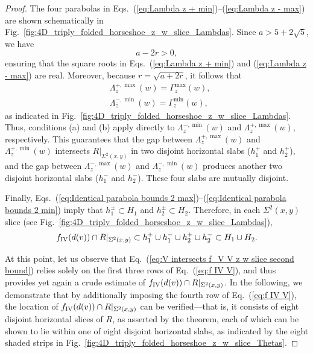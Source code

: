 \documentclass[12pt]{iopart}
\begin{document}
\begin{proof}
The four parabolas in Eqs.~(\ref{eq:Lambda z + min})–(\ref{eq:Lambda z - max}) are shown schematically in Fig.~\ref{fig:4D_triply_folded_horseshoe_z_w_slice_Lambdas}.  
Since $a > 5 + 2\sqrt{5}$, we have
\begin{equation}\label{eq:a-2r}
a - 2r > 0,
\end{equation}
ensuring that the square roots in Eqs.~(\ref{eq:Lambda z + min}) and (\ref{eq:Lambda z - max}) are real.  
Moreover, because $r = \sqrt{a+2r}$, it follows that
\begin{eqnarray}
& \Lambda^{+,\max}_z(w) = \Gamma^{\max}_z(w), \label{eq:Identical parabola bounds 2 max} \\
& \Lambda^{-,\min}_z(w) = \Gamma^{\min}_z(w), \label{eq:Identical parabola bounds 2 min}
\end{eqnarray}
as indicated in Fig.~\ref{fig:4D_triply_folded_horseshoe_z_w_slice_Lambdas}.  
Thus, conditions (a) and (b) apply directly to $\Lambda^{-,\min}_z(w)$ and $\Lambda^{+,\max}_z(w)$, respectively.  
This guarantees that the gap between $\Lambda^{+,\max}_z(w)$ and $\Lambda^{+,\min}_z(w)$ intersects $R|_{\Sigma^2(x,y)}$ in two disjoint horizontal slabs ($h^+_1$ and $h^+_2$), and the gap between $\Lambda^{-,\max}_z(w)$ and $\Lambda^{-,\min}_z(w)$ produces another two disjoint horizontal slabs ($h^-_1$ and $h^-_2$). These four slabs are mutually disjoint.

Finally, Eqs.~(\ref{eq:Identical parabola bounds 2 max})–(\ref{eq:Identical parabola bounds 2 min}) imply that $h^{\pm}_1 \subset H_1$ and $h^{\pm}_2 \subset H_2$.  
Therefore, in each $\Sigma^2(x,y)$ slice (see Fig.~\ref{fig:4D_triply_folded_horseshoe_z_w_slice_Lambdas}),
\begin{equation}\label{eq:V intersects f_V V z w slice second bound}
f_{\rm IV}(d(v)) \cap R|_{\Sigma^2(x,y)} 
\subset h^{+}_1 \cup h^{-}_1 \cup h^{+}_2 \cup h^{-}_2 
\subset H_1 \cup H_2.
\end{equation}

At this point, let us observe that Eq.~(\ref{eq:V intersects f_V V z w slice second bound}) relies solely on the first three rows of Eq.~(\ref{eq:f IV V}), and thus provides yet again a crude estimate of $f_{\rm IV}(d(v))\cap R|_{\Sigma^2(x,y)}$. In the following, we demonstrate that by additionally imposing the fourth row of Eq.~(\ref{eq:f IV V}), the location of $f_{\rm IV}(d(v))\cap R|_{\Sigma^2(x,y)}$ can be verified---that is, it consists of eight disjoint horizontal slices of $R$, as asserted by the theorem, each of which can be shown to lie within one of eight disjoint horizontal slabs, as indicated by the eight shaded strips in Fig.~\ref{fig:4D_triply_folded_horseshoe_z_w_slice_Thetas}. 


\end{proof}
\end{document}
